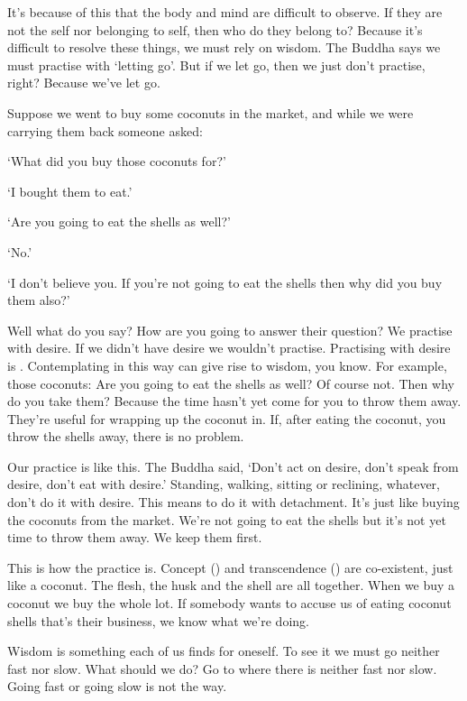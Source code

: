 It's because of this that the body and mind are difficult to observe. If they are not the self nor belonging to self, then who do they belong to? Because it's difficult to resolve these things, we must rely on wisdom. The Buddha says we must practise with `letting go'. But if we let go, then we just don't practise, right? Because we've let go. 

Suppose we went to buy some coconuts in the market, and while we were carrying them back someone asked: 

`What did you buy those coconuts for?' 

`I bought them to eat.' 

`Are you going to eat the shells as well?' 

`No.' 

`I don't believe you. If you're not going to eat the shells then why did you buy them also?' 

Well what do you say? How are you going to answer their question? We practise with desire. If we didn't have desire we wouldn't practise. Practising with desire is . Contemplating in this way can give rise to wisdom, you know. For example, those coconuts: Are you going to eat the shells as well? Of course not. Then why do you take them? Because the time hasn't yet come for you to throw them away. They're useful for wrapping up the coconut in. If, after eating the coconut, you throw the shells away, there is no problem. 

Our practice is like this. The Buddha said, `Don't act on desire, don't speak from desire, don't eat with desire.' Standing, walking, sitting or reclining, whatever, don't do it with desire. This means to do it with detachment. It's just like buying the coconuts from the market. We're not going to eat the shells but it's not yet time to throw them away. We keep them first.

This is how the practice is. Concept () and transcendence () are co-existent, just like a coconut. The flesh, the husk and the shell are all together. When we buy a coconut we buy the whole lot. If somebody wants to accuse us of eating coconut shells that's their business, we know what we're doing. 

Wisdom is something each of us finds for oneself. To see it we must go neither fast nor slow. What should we do? Go to where there is neither fast nor slow. Going fast or going slow is not the way. 

